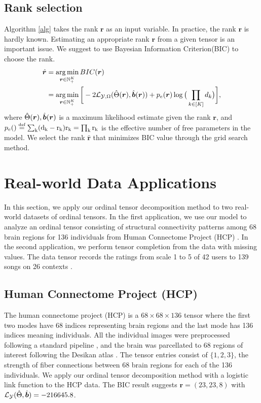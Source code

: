 \documentclass{article}
\theoremstyle{plain}
\theoremstyle{definition}
\begin{document}
\subsection{Rank selection}
Algorithm \ref{alg} takes  the rank $\bm r$ as an input variable. In practice, the rank $\bm r$ is hardly known. Estimating an appropriate rank $\bm r$ from a given tensor is an important issue. We suggest to use Bayesian Information Criterion(BIC) to choose the rank.
\begin{equation}
    \label{bic}
    \begin{aligned}
        \hat{\bm r} &= \operatorname*{arg\,min}_{\bm r\in \mathbb{N}_+^K} BIC(\bm r)\\
        &=\operatorname*{arg\,min}_{\bm r\in \mathbb{N}_+^K}\bigg[-2\mathcal{L}_{\mathcal{Y},\Omega}(\hat\Theta(\bm r),\hat{\bm{b}}(\bm{r})) +
        p_e(\bm{r})\log\big(\prod_{k\in[K]} d_k\big)\bigg],
    \end{aligned}
\end{equation}
where $\hat\Theta(\bm r),\hat{\bm{b}}(\bm{r})$ is a maximum likelihood estimate given the rank $\bm r$, and $p_e(\rm)\eqdef \sum_k(d_k-r_k)r_k = \prod_k r_k$ is the effective number of free parameters in the model. We select the rank $\hat{\bm r}$ that minimizes BIC value through the grid search method.
\section{Real-world Data Applications}
In this section, we apply our ordinal tensor decomposition method to two real-world datasets of ordinal tensors. In the first application, we use our model to analyze an ordinal tensor consisting of structural connectivity patterns among 68 brain regions for 136 individuals from Human Connectome Project (HCP) \citep{geddes2016human}. In the second application, we perform tensor completion from the data with missing values. The data tensor records the ratings from scale 1 to 5 of 42 users to 139 songs on 26 contexts \citep{baltrunas2011incarmusic}.
\subsection{Human Connectome Project (HCP)}
The human connectome project (HCP) is a $68\times 68 \times 136$ tensor where the first two modes have 68 indices representing brain regions and the last mode has 136 indices meaning individuals. All the individual images were preprocessed following a standard pipeline \citep{zhang2018mapping}, and the brain was parcellated to 68 regions of interest following the Desikan atlas \citep{desikan2006automated}. The tensor entries consist of $\{1,2,3\}$, the strength of fiber connections between 68 brain regions for each of the 136 individuals. We apply our ordinal tensor decomposition method with a logistic link function to the HCP data. The BIC result suggests $\bm r = (23,23,8)$  with $\mathcal{L}_\mathcal{Y}(\hat{\Theta},\hat{\bm{b}}) = -216645.8$.
\end{document}
